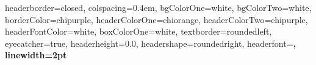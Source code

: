 \documentclass[landscape,a0paper,fontscale=0.285]{baposter} %
\begin{document}
\begin{poster}
{
headerborder=closed, %
colspacing=0.4em, %
bgColorOne=white, %
bgColorTwo=white, %
borderColor=chipurple, %
headerColorOne=chiorange, %
headerColorTwo=chipurple, %
headerFontColor=white, %
boxColorOne=white, %
textborder=roundedleft, %
eyecatcher=true, %
headerheight=0.0\textheight, %
headershape=roundedright, %
headerfont=\Large\bf\textsc, %
linewidth=2pt %
}
{} %
{}


\end{poster}
\end{document}
